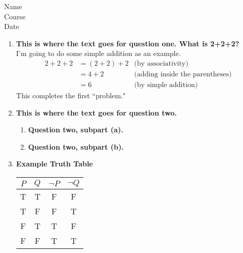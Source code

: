 \documentclass{article}
\begin{document}
Name\\
Course\\
Date \\[10pt]

\begin{enumerate}
\item\textbf{This is where the text goes for question one. What is 2+2+2?} \\[5pt]
	I'm going to do some simple addition as an example.
	\begin{align*} %
	2 + 2 + 2 & = (2 + 2) + 2 &\text{(by associativity)} \\ %
	& = 4 + 2 & \text{(adding inside the parentheses)} \\
	& \boxed{ = 6} & \text{(by simple addition)} %
	\end{align*}
	This completes the first ``problem." 
	
	\vspace{10pt} %

\item\textbf{This is where the text goes for question two.}
	\begin{enumerate}
		\item\textbf{Question two, subpart (a).}
		\item\textbf{Question two, subpart (b).}
	\end{enumerate}
	
	\vspace{20pt}
	
\item\textbf{Example Truth Table}
	\begin{center}
			\begin{tabular}{c c c c} %
				$P$		&$Q$		&$\neg P$	&$\neg Q$	\\ %
				\hline
				T		&T		&F			&F			\\
				T		&F		&F			&T			\\
				F		&T		&T			&F			\\
				F		&F		&T			&T					
		\end{tabular}
	\end{center}


\end{enumerate}
\end{document}
